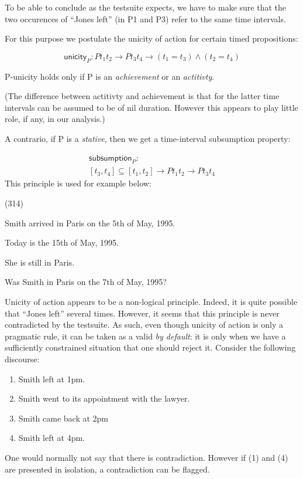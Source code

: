 \documentclass[a4paper,11pt]{article}
\newcommand\hyp{\item[H]}
\newcommand\fracasex[2]{\begin{lingex}\item[(#1)] \begin{subex} #2 \end{subex} \end{lingex} }
\newcommand\constant[1]{\mathsf{#1}}
\begin{document}
To be able to conclude as the testsuite expects, we have to make sure
that the two occurences of ``Jones left'' (in P1 and P3) refer to the
same time intervals.

For this purpose we postulate the unicity of action for certain timed
propositions:

\[\constant{unicity}_P : P t_1 t_2 → P t_3 t_4 → (t_1 = t_3) ∧ (t_2 = t_4)\]

P-unicity holds only if P is an \emph{achievement} or an \emph{actitivty}.

(The difference between actitivty and achievement is that for the
latter time intervals can be assumed to be of nil duration. However
this appears to play little role, if any, in our analysis.)

A contrario, if P is a \emph{stative}, then we get a time-interval subsumption property:

\begin{multline*}
\constant {subsumption}_P :\\ [t_3,t_4] ⊆ [t_1,t_2] → P t_1 t_2 → P t_3 t_4
\end{multline*}
This principle is used for example below:

\fracasex{314}
{\item	Smith arrived in Paris on the 5th of May, 1995.
\item	Today is the 15th of May, 1995.
\item	She is still in Paris.
\hyp 	Was Smith in Paris on the 7th of May, 1995? 
}

Unicity of action appears to be a non-logical principle. Indeed, it is
quite possible that ``Jones left'' several times. However, it seems
that this principle is never contradicted by the testsuite. As such,
even though unicity of action is only a pragmatic rule, it can be
taken as a valid \emph{by default}: it is only when we have a
sufficiently constrained situation that one should reject it. Consider
the following discourse:

\begin{enumerate}[parsep=0pt,itemsep=1pt,label=(\arabic*)]
\item Smith left at 1pm.
\item Smith went to its appointment with the lawyer.
\item Smith came back at 2pm
\item Smith left at 4pm.
\end{enumerate}
One would normally not say that there is contradiction. However if (1)
and (4) are presented in isolation, a contradiction can be flagged.
\end{document}

